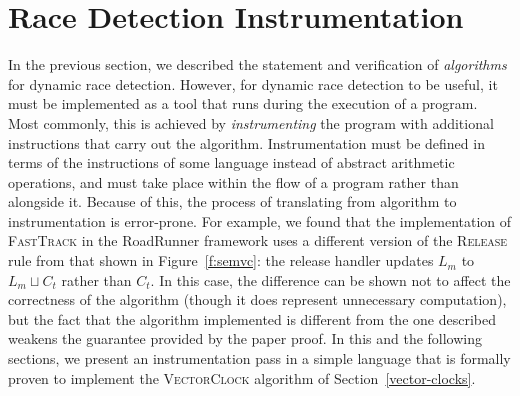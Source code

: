 \documentclass[preprint, 10pt]{sigplanconf}
\newcommand{\VCalg}{\textsc{VectorClock}\xspace}
\newcommand{\FT}{\textsc{FastTrack}\xspace}
\newcommand{\Rule}[1]{\textsc{#1}}
\begin{document}
\section{Race Detection Instrumentation}
\label{language}

In the previous section, we described the statement and verification of \emph{algorithms} for dynamic race detection. However, for dynamic race detection to be useful, it must be implemented as a tool that runs during the execution of a program. Most commonly, this is achieved by \emph{instrumenting} the program with additional instructions that carry out the algorithm. Instrumentation must be defined in terms of the instructions of some language instead of abstract arithmetic operations, and must take place within the flow of a program rather than alongside it. Because of this, the process of translating from algorithm to instrumentation is error-prone. For example, we found that the implementation of \FT in the RoadRunner framework uses a different version of the \Rule{Release} rule from that shown in Figure~\ref{f:semvc}: the release handler updates $L_m$ to $L_m \sqcup C_t$ rather than $C_t$. In this case, the difference can be shown not to affect the correctness of the algorithm (though it does represent unnecessary computation), but the fact that the algorithm implemented is different from the one described weakens the guarantee provided by the paper proof. In this and the following sections, we present an instrumentation pass in a simple language that is formally proven to implement the \VCalg algorithm of Section~\ref{vector-clocks}.
\end{document}

